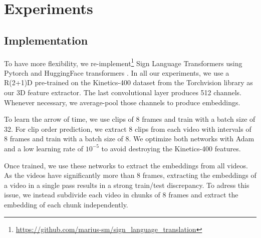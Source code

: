 \documentclass[final]{cvpr}
\begin{document}
\section{Experiments}
\subsection{Implementation}

To have more flexibility, we re-implement\footnote{\url{https://github.com/marius-sm/sign_language_translation}} Sign Language Transformers \cite{neccam} using Pytorch and HuggingFace transformers \cite{huggingface}. In all our experiments, we use a R(2+1)D \cite{r2plus1} pre-trained on the Kinetics-400 \cite{kinetics} dataset from the Torchvision library as our 3D feature extractor. The last convolutional layer produces 512 channels. Whenever necessary, we average-pool those channels to produce embeddings.

To learn the arrow of time, we use clips of 8 frames and train with a batch size of 32. For clip order prediction, we extract 8 clips from each video with intervals of 8 frames and train with a batch size of 8. We optimize both networks with Adam and a low learning rate of $10^{-5}$ to avoid destroying the Kinetics-400 features.

Once trained, we use these networks to extract the embeddings from all videos. As the videos have significantly more than 8 frames,  extracting the embeddings of a video in a single pass results in a strong train/test discrepancy. To adress this issue, we instead subdivide each video in chunks of 8 frames and extract the embedding of each chunk independently.
\end{document}
